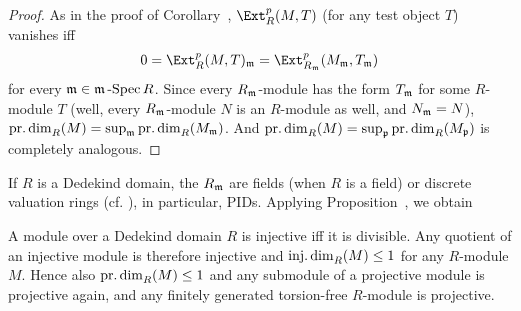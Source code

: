 \documentclass[a4paper,parskip=half,numbers=enddot, DIV=12]{scrreprt}
\begin{document}
\begin{proof}
	As in the proof of Corollary~, $\Ext_R^p(M,T)$ (for any test object $T$) vanishes iff
	\begin{align*}
		0=\Ext_R^p(M,T)_\mm=\Ext_{R_\mm}^p(M_\mm,T_\mm)
	\end{align*}
	for every $\mathfrak{m}\in\mathfrak{m}\operatorname{-Spec} R$. Since every $R_{\mathfrak{m}}$-module has the form $T_{\mathfrak{m}}$ for some $R$-module $T$ (well, every $R_{\mathfrak{m}}$-module $N$ is an $R$-module as well, and $N_{\mathfrak{m}}=N$), $\operatorname{pr.dim}_R(M)=\sup_{\mathfrak{m}}\operatorname{pr.dim}_R(M_{\mathfrak{m}})$. And $\operatorname{pr.dim}_R(M)=\sup_{\mathfrak{p}}\operatorname{pr.dim}_R(M_{\mathfrak{p}})$ is completely analogous.
\end{proof}
If $R$ is a Dedekind domain, the $R_{\mathfrak{m}}$ are fields (when $R$ is a field) or discrete valuation rings (cf. \cite[Theorem~22]{alg2}), in particular, PIDs. Applying Proposition~, we obtain
\begin{cor}
	A module over a Dedekind domain $R$ is injective iff it is divisible. Any quotient of an injective module is therefore injective and $\operatorname{inj.dim}_R(M)\leq 1$ for any $R$-module $M$. Hence also $\operatorname{pr.dim}_R(M)\leq 1$ and any submodule of a projective module is projective again, and any finitely generated torsion-free $R$-module is projective.
\end{cor}
\end{document}
